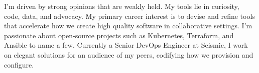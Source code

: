 

\begin{cvparagraph}

I'm driven by strong opinions that are weakly held. My tools lie in curiosity, code, data, and advocacy. My primary career interest is to devise and refine tools that accelerate how we create high quality software in collaborative settings. I'm passionate about open-source projects such as Kubernetes, Terraform, and Ansible to name a few. Currently a Senior DevOps Engineer at Seismic, I work on elegant solutions for an audience of my peers, codifying how we provision and configure.
\end{cvparagraph}
